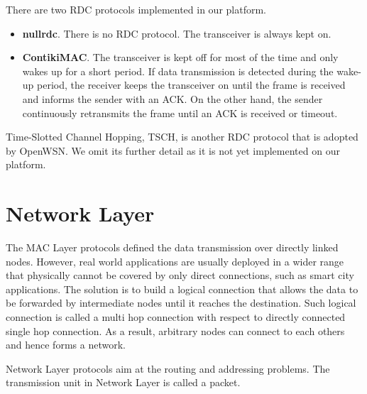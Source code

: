 There are two RDC protocols implemented in our platform.

\begin{itemize}
\item \textbf{nullrdc}. There is no RDC protocol. The transceiver is always kept on.
\item \textbf{ContikiMAC\cite{ContikiMAC}}. The transceiver is kept off for most of the time and only wakes up for a short period. If data transmission is detected during the wake-up period, the receiver keeps the transceiver on until the frame is received and informs the sender with an ACK. On the other hand, the sender continuously retransmits the frame until an ACK is received or timeout.
\end{itemize}

Time-Slotted Channel Hopping\cite{TSCH}, TSCH, is another RDC protocol that is adopted by OpenWSN. We omit its further detail as it is not yet implemented on our platform.

\section{Network Layer}
The MAC Layer protocols defined the data transmission over directly linked nodes. However, real world applications are usually deployed in a wider range that physically cannot be covered by only direct connections, such as smart city applications. The solution is to build a logical connection that allows the data to be forwarded by intermediate nodes until it reaches the destination. Such logical connection is called a multi hop connection with respect to directly connected single hop connection. As a result, arbitrary nodes can connect to each others and hence forms a network.

Network Layer protocols aim at the routing and addressing problems. The transmission unit in Network Layer is called a packet.

